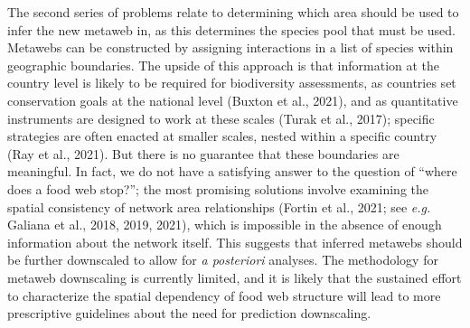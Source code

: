 \documentclass[10pt,oneside]{article}
\begin{document}
The second series of problems relate to determining which area should be
used to infer the new metaweb in, as this determines the species pool
that must be used. Metawebs can be constructed by assigning interactions
in a list of species within geographic boundaries. The upside of this
approach is that information at the country level is likely to be
required for biodiversity assessments, as countries set conservation
goals at the national level (Buxton et al., 2021), and as quantitative
instruments are designed to work at these scales (Turak et al., 2017);
specific strategies are often enacted at smaller scales, nested within a
specific country (Ray et al., 2021). But there is no guarantee that
these boundaries are meaningful. In fact, we do not have a satisfying
answer to the question of ``where does a food web stop?''; the most
promising solutions involve examining the spatial consistency of network
area relationships (Fortin et al., 2021; see \emph{e.g.} Galiana et al.,
2018, 2019, 2021), which is impossible in the absence of enough
information about the network itself. This suggests that inferred
metawebs should be further downscaled to allow for \emph{a posteriori}
analyses. The methodology for metaweb downscaling is currently limited,
and it is likely that the sustained effort to characterize the spatial
dependency of food web structure will lead to more prescriptive
guidelines about the need for prediction downscaling.
\end{document}
